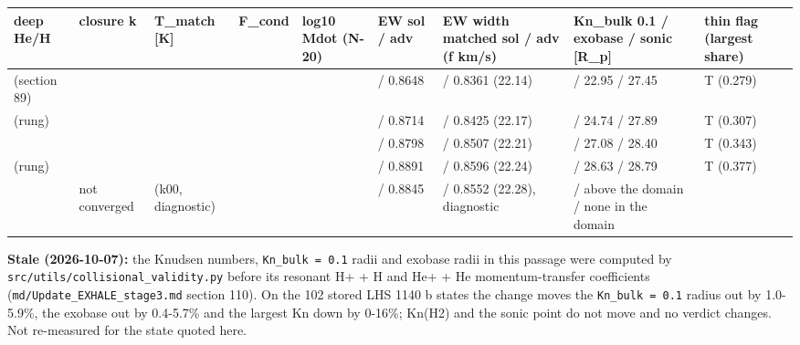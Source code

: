 \documentclass[english,a4paper]{my_memo}
\begin{document}
{\def\LTcaptype{none} %
{\small
\begin{longtable}[]{@{}>{\raggedright\arraybackslash}p{\dimexpr(\linewidth-18\tabcolsep)/9\relax}>{\raggedright\arraybackslash}p{\dimexpr(\linewidth-18\tabcolsep)/9\relax}>{\raggedright\arraybackslash}p{\dimexpr(\linewidth-18\tabcolsep)/9\relax}>{\raggedright\arraybackslash}p{\dimexpr(\linewidth-18\tabcolsep)/9\relax}>{\raggedright\arraybackslash}p{\dimexpr(\linewidth-18\tabcolsep)/9\relax}>{\raggedright\arraybackslash}p{\dimexpr(\linewidth-18\tabcolsep)/9\relax}>{\raggedright\arraybackslash}p{\dimexpr(\linewidth-18\tabcolsep)/9\relax}>{\raggedright\arraybackslash}p{\dimexpr(\linewidth-18\tabcolsep)/9\relax}>{\raggedright\arraybackslash}p{\dimexpr(\linewidth-18\tabcolsep)/9\relax}@{}}
\toprule\noalign{}
deep He/H & closure k & T\_match {[}K{]} & F\_cond & log10 Mdot (N-20) & EW sol / adv & EW width matched sol / adv (f km/s) & Kn\_bulk 0.1 / exobase / sonic {[}R\_p{]} & thin flag (largest share) \\
\midrule\noalign{}
\endhead
\bottomrule\noalign{}
\endlastfoot
1.2 (section 89) & 1 & 386.37 & 17.16 & 8.0218 & 0.8593 / 0.8648 & 0.8308 / 0.8361 (22.14) & 7.08 / 22.95 / 27.45 & T (0.279) \\
1.0 (rung) & 1 & 399.39 & 19.82 & 8.0531 & 0.8655 / 0.8714 & 0.8368 / 0.8425 (22.17) & 7.50 / 24.74 / 27.89 & T (0.307) \\
0.8 & 1 & 410.53 & 22.95 & 8.0930 & 0.8734 / 0.8798 & 0.8444 / 0.8507 (22.21) & 8.04 / 27.08 / 28.40 & T (0.343) \\
0.65 (rung) & 2 & 412.59 & 25.87 & 8.1325 & 0.8822 / 0.8891 & 0.8529 / 0.8596 (22.24) & 8.57 / 28.63 / 28.79 & T (0.377) \\
0.5 & not converged & 398.51 (k00, diagnostic) & 29.51 & 8.179 & 0.8773 / 0.8845 & 0.8482 / 0.8552 (22.28), diagnostic & 9.24 / above the domain / none in the domain & \\
\end{longtable}
}
}

\textbf{Stale (2026-10-07):} the Knudsen numbers, \texttt{Kn\_bulk\ =\ 0.1} radii and exobase radii in this passage were computed by \texttt{src/utils/collisional\_validity.py} before its resonant H+ + H and He+ + He momentum-transfer coefficients (\texttt{md/Update\_EXHALE\_stage3.md} section 110). On the 102 stored LHS 1140 b states the change moves the \texttt{Kn\_bulk\ =\ 0.1} radius out by 1.0-5.9\%, the exobase out by 0.4-5.7\% and the largest Kn down by 0-16\%; Kn(H2) and the sonic point do not move and no verdict changes. Not re-measured for the state quoted here.
\end{document}
